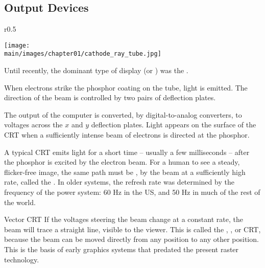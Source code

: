 \documentclass[../COS3712_Notes.tex]{subfiles}
\begin{document}
      \subsection{Output Devices}
        \begin{wrapfigure}{r}{0.5\textwidth}
          \begin{center}
            \texttt{[image: \\main/images/chapter01/cathode\_ray\_tube.jpg]}
          \end{center}
          \caption{Cathode-Ray Tube (CRT)}
        \end{wrapfigure}

        Until recently, the dominant type of display (or ) was the
        .

        When electrons strike the phosphor coating on the tube, light is emitted.
        The direction of the beam is controlled by two pairs of deflection plates.

        The output of the computer is converted, by digital-to-analog converters,
        to voltages across the $x$ and $y$ deflection plates.
        Light appears on the surface of the CRT when a sufficiently intense beam of electrons
        is directed at the phosphor.

        A typical CRT emits light for a short time -- usually a few milliseconds
        -- after the phosphor is excited by the electron beam.
        For a human to see a steady, flicker-free image, the same path must be ,
        by the beam at a sufficiently high rate, called the .
        In older systems, the refresh rate was determined by the frequency of the power system:
        60 Hz in the US, and 50 Hz in much of the rest of the world.

        \begin{definition}{Vector CRT}
          If the voltages steering the beam change at a constant rate,
          the beam will trace a straight line, visible to the viewer.
          This is called the \mbox{}, ,
          or  CRT,
          because the beam can be moved directly from any position to any other position.
          This is the basis of early graphics systems that predated the present raster technology.
        \end{definition}
\end{document}
